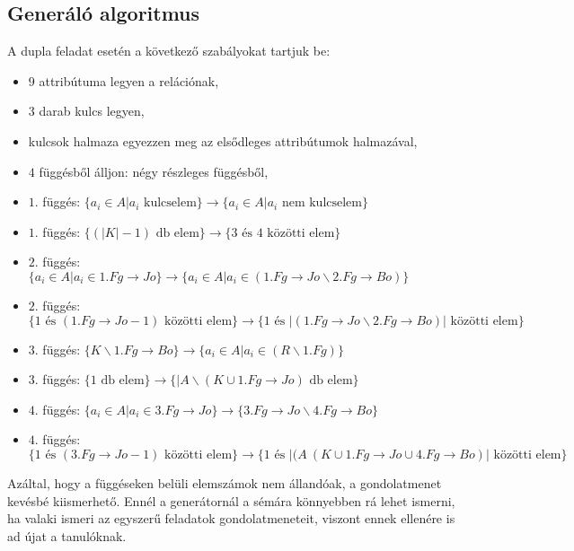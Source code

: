 \subsection{Generáló algoritmus}

A dupla feladat esetén a következő szabályokat tartjuk be:
\begin{itemize}
    \item $9$ attribútuma legyen a relációnak,
    \item $3$ darab kulcs legyen,
    \item kulcsok halmaza egyezzen meg az elsődleges attribútumok halmazával,
    \item $4$ függésből álljon: négy részleges függésből,
    \item $1.$ függés: $\big\{ a_i \in A \big| a_i \text{ kulcselem}  \big\} \longrightarrow \big\{  a_i \in A \big| a_i \text{ nem kulcselem}  \big\}$ 
    \item $1.$ függés: $\big \{ (|K|-1) \text{ db elem} \big\} \longrightarrow \big\{ 3 \text{ és } 4 \text{ közötti elem} \big \}$
    \item $2.$ függés: $\big\{ a_i \in A \big| a_i \in 1.Fg \rightarrow Jo  \big\} \longrightarrow \big\{  a_i \in A \big| a_i \in (1.Fg \rightarrow Jo \backslash 2.Fg \rightarrow Bo)  \big\}$ 
    \item $2.$ függés: $\big \{ 1 \text{ és } (1.Fg\rightarrow Jo - 1) \text{ közötti elem} \big\} \longrightarrow \big\{ 1 \text { és } |(1.Fg \rightarrow Jo \backslash 2.Fg \rightarrow Bo)|  \text{ közötti elem} \big \}$
    \item $3.$ függés: $\big\{ K \backslash 1.Fg\rightarrow Bo \big\} \longrightarrow \big\{  a_i \in A \big| a_i \in (R \backslash 1.Fg)  \big\}$
    \item $3.$ függés: $\big \{ 1 \text{ db elem} \big\} \longrightarrow \big\{|A \backslash (K \cup 1.Fg \rightarrow Jo) \text{ db elem} \big \}$
    \item $4.$ függés: $\big\{ a_i \in A \big| a_i \in 3.Fg\rightarrow Jo \big\} \longrightarrow \big\{ 3.Fg\rightarrow Jo \backslash 4.Fg\rightarrow Bo\big\}$
    \item $4.$ függés: $\big \{ 1 \text{ és } (3.Fg\rightarrow Jo - 1) \text{ közötti elem} \big\} \longrightarrow \big\{ 1 \text { és } |(A \ (K \cup 1.Fg \rightarrow Jo \cup 4.Fg \rightarrow Bo)|  \text{ közötti elem} \big \}$
\end{itemize}

Azáltal, hogy a függéseken belüli elemszámok nem állandóak, a gondolatmenet kevésbé kiismerhető. Ennél a generátornál a sémára könnyebben rá lehet ismerni, ha valaki ismeri az egyszerű feladatok gondolatmeneteit, viszont ennek ellenére is ad újat a tanulóknak.

